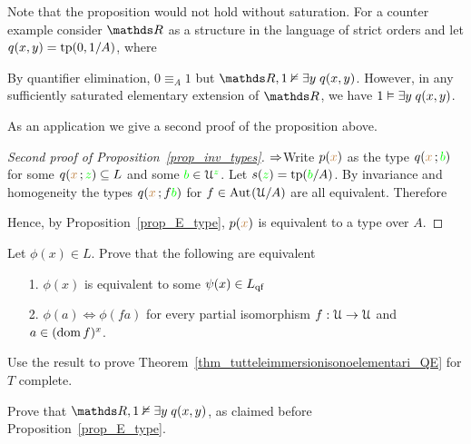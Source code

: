 Note that the proposition would not hold without saturation.
For a counter example consider $\RR$ as a structure in the language of strict orders and let $q(x,y)={\rm tp}(0,1/A)$, where 


By quantifier elimination, $0\equiv_{A}1$ but $\RR,1\notmodels\E y\;q(x,y)$.
However, in any sufficiently saturated elementary extension of $\RR$, we have $1\vDash\exists y\;q(x,y)$.

As an application we give a second proof of the proposition above.

\begin{proof}[Second proof of Proposition~\ref{prop_inv_types}] $\Rightarrow$\quad  Write $p({\color{brown} x})$ as the type $q({\color{brown} x}\,;{\color{green} b})$ for some $q({\color{brown} x}\,;{\color{green} z})\subseteq L$ and some ${\color{green} b}\in\EuScript U^{\color{green} z}$.
Let $s({\color{green} z})={\rm tp}({\color{green} b}/A)$.
By invariance and homogeneity the types $q({\color{brown} x}\,;f{\color{green} b})$ for $f\in{\rm Aut\kern.15ex}(\EuScript U/A)$ are all equivalent.
Therefore

\smallskip

\smallskip

\smallskip

Hence, by Proposition~\ref{prop_E_type}, $p({\color{brown} x})$ is equivalent to a type over $A$.
\end{proof}

\begin{exercise}\label{ex_qe_in_U}
  Let $\phi(x)\in L$. Prove that the following are equivalent
  \begin{itemize}
   \item[1.] $\phi(x)$ is equivalent to some $\psi(x)\in L_{\rm qf}$
   \item[2.] $\phi(a)\iff \phi(fa)$ for every partial isomorphism $f:\EuScript U\to\EuScript U$ and $a\in(\mathop{\rm dom} f)^{x}$.
  \end{itemize}
  Use the result to prove Theorem~\ref{thm_tutteleimmersionisonoelementari_QE} for $T$ complete.
  \end{exercise}

\begin{exercise}\label{ex_E_type}
Prove that $\RR,1\notmodels\E y\;q(x,y)$, as claimed before Proposition~\ref{prop_E_type}.
\end{exercise}

